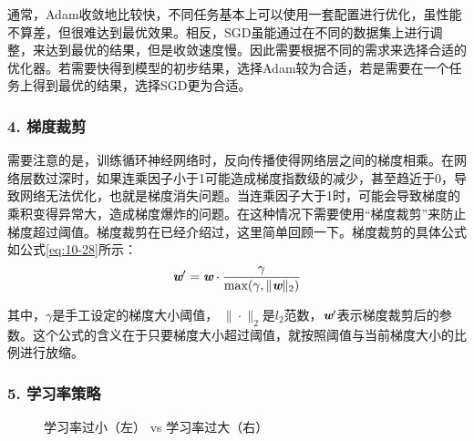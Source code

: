 \parinterval 通常，Adam收敛地比较快，不同任务基本上可以使用一套配置进行优化，虽性能不算差，但很难达到最优效果。相反，SGD虽能通过在不同的数据集上进行调整，来达到最优的结果，但是收敛速度慢。因此需要根据不同的需求来选择合适的优化器。若需要快得到模型的初步结果，选择Adam较为合适，若是需要在一个任务上得到最优的结果，选择SGD更为合适。


\subsubsection{4. 梯度裁剪}

\parinterval 需要注意的是，训练循环神经网络时，反向传播使得网络层之间的梯度相乘。在网络层数过深时，如果连乘因子小于1可能造成梯度指数级的减少，甚至趋近于0，导致网络无法优化，也就是梯度消失问题。当连乘因子大于1时，可能会导致梯度的乘积变得异常大，造成梯度爆炸的问题。在这种情况下需要使用“梯度裁剪”来防止梯度超过阈值。梯度裁剪在{\chapternine}已经介绍过，这里简单回顾一下。梯度裁剪的具体公式如公式\eqref{eq:10-28}所示：
\vspace{-0.5em}
\begin{eqnarray}
\textbf{\em w}' = \textbf{\em w} \cdot \frac{\gamma} {\textrm{max}(\gamma,\| \textbf{\em w} \|_2)}
\label{eq:10-28}
\end{eqnarray}

\noindent 其中，$\gamma$是手工设定的梯度大小阈值， $\| \cdot \|_2$是$l_2$范数，$\textbf{\em w}'$表示梯度裁剪后的参数。这个公式的含义在于只要梯度大小超过阈值，就按照阈值与当前梯度大小的比例进行放缩。


\subsubsection{5. 学习率策略}

\begin{figure}[htp]
\centering

\caption{学习率过小（左） vs 学习率过大（右） }
\label{fig:10-25}
\end{figure}

